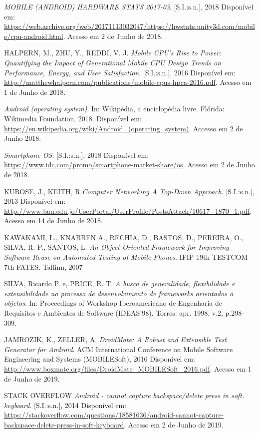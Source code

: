 \documentclass[
    12pt,       %
    openright,      %
    twoside,      %
    a4paper,      %
    english,      %
    french,       %
    spanish,      %
    brazil,       %
    ]{abntex2}
\begin{document}
  \noindent
  \textit{MOBILE (ANDROID) HARDWARE STATS 2017-03}. [S.I.:s.n.], 2018 Disponível em: \url{https://web.archive.org/web/20171113032047/https://hwstats.unity3d.com/mobile/cpu-android.html}. Acesso em 2 de Junho de 2018.

  \noindent
  HALPERN, M., ZHU, Y., REDDI, V. J. \textit{Mobile CPU’s Rise to Power: Quantifying the Impact of Generational Mobile CPU Design Trends on Performance, Energy, and User Satisfaction}.
  [S.I.:s.n.], 2016 Disponível em: \url{http://matthewhalpern.com/publications/mobile-cpus-hpca-2016.pdf}. Acesso em 1 de Junho de 2018.

  \noindent
  \textit{Android (operating system)}. In: Wikipédia, a enciclopédia livre. Flórida: Wikimedia Foundation,
  2018. Disponível em:
  \url{https://en.wikipedia.org/wiki/Android_(operating_system)}. Accesso
  em 2 de Junho 2018.

  \noindent
  \textit{Smartphone OS}. [S.I.:s.n.], 2018 Disponível em: \url{https://www.idc.com/promo/smartphone-market-share/os}.
  Acesso em 2 de Junho de 2018.

  \noindent
  KUROSE, J., KEITH, R.\textit{Computer Networking A Top-Down Approach}. [S.I.:s.n.], 2013 Disponível em: \url{http://www.bau.edu.jo/UserPortal/UserProfile/PostsAttach/10617_1870_1.pdf}. Acesso em 14 de Junho de 2018.

  \noindent
  KAWAKAMI, L., KNABBEN A., RECHIA, D., BASTOS, D., PEREIRA, O., SILVA, R. P., SANTOS, L. \textit{An Object-Oriented Framework for Improving Software Reuse on Automated Testing of Mobile Phones}. IFIP 19th TESTCOM - 7th FATES. Tallinn, 2007

  \noindent
  SILVA, Ricardo P. e, PRICE, R. T. \textit{A busca de generalidade, flexibilidade e extensibilidade no processo de desenvolvimento de frameworks orientados a objetos}.
  In: Proceedings of Workshop Iberoamericano de Engenharia de Requisitos e Ambientes de Software (IDEAS'98). Torres: apr. 1998. v.2, p.298-309.

  \noindent
  JAMROZIK, K., ZELLER, A.  \textit{DroidMate: A Robust and Extensible Test Generator
  for Android}. ACM International Conference on Mobile Software Engineering and Systems (MOBILESoft), 2016 Disponível em: \url{http://www.boxmate.org/files/DroidMate_MOBILESoft_2016.pdf}. Acesso em 1 de Junho de 2019.

  \noindent
  STACK OVERFLOW \textit{Android - cannot capture backspace/delete press in soft. keyboard}. [S.I.:s.n.], 2014 Disponível em:
  \url{https://stackoverflow.com/questions/18581636/android-cannot-capture-backspace-delete-press-in-soft-keyboard}. Acesso em 2 de Junho de 2019.
\end{document}
